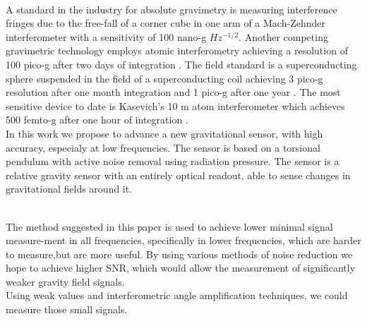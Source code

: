 \documentclass[\main/master.tex]{subfiles}
\begin{document}
\fi
\\
A standard in the industry for absolute gravimetry is measuring interference fringes due to the free-fall of a corner cube in one arm of a Mach-Zehnder interferometer with a sensitivity of 100 nano-g $Hz^{-1/2}$. Another competing gravimetric technology employs atomic interferometry achieving a resolution of 100 pico-g after two days of integration \cite{Peters01}. 
The field standard is a superconducting sphere suspended in the field of a superconducting coil achieving 3 pico-g resolution after one month integration and 1 pico-g  after one year \cite{Goodkind99}. 
The most sensitive device to date is Kasevich's 10 m atom interferometer which achieves 500 femto-g after one hour of integration \cite{PhysRevA.91.033629,kasevich2014prospects}. 
\\
In this work we propose to advance a new gravitational sensor, with high accuracy, especialy at low frequencies. The sensor is based on a torsional pendulum with active noise removal using radiation pressure. The sensor is a relative gravity sensor with an entirely optical readout, able to sense changes in gravitational fields around it. 
\iffalse
\fi
\\
The method suggested in this paper is used to achieve lower minimal signal measure-ment in all frequencies, specifically in lower frequencies, which are harder to measure,but are more useful. By using various methods of noise reduction we hope to achieve higher SNR, which would allow the measurement of significantly weaker gravity field signals.
\\
Using weak values and interferometric angle amplification techniques, we could measure those small signals.
\end{document}
